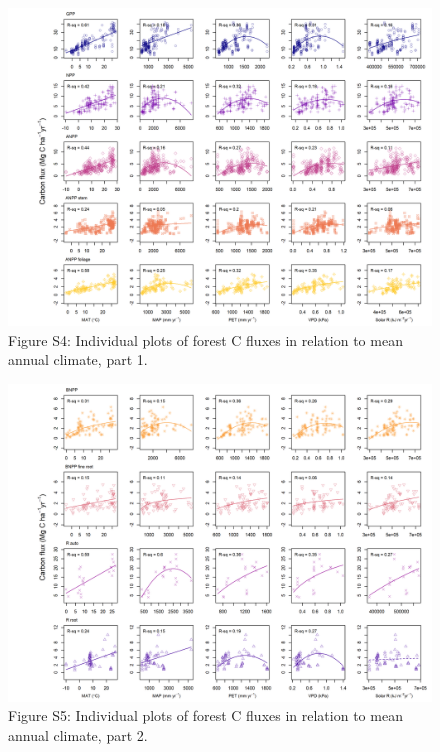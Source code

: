 \documentclass[
]{article}
\begin{document}
\begin{landscape}
\begin{figure}[H]
\includegraphics[height=0.95\textheight]{tables_figures/grid_plots_climate1} \caption{Figure S4: Individual plots of forest C fluxes in relation to mean annual climate, part 1.}\label{fig:unnamed-chunk-12}
\end{figure}

\newpage

\begin{figure}[H]
\includegraphics[height=0.95\textheight]{tables_figures/grid_plots_climate2} \caption{Figure S5: Individual plots of forest C fluxes in relation to mean annual climate, part 2.}\label{fig:unnamed-chunk-13}
\end{figure}
\end{landscape}
\end{document}
